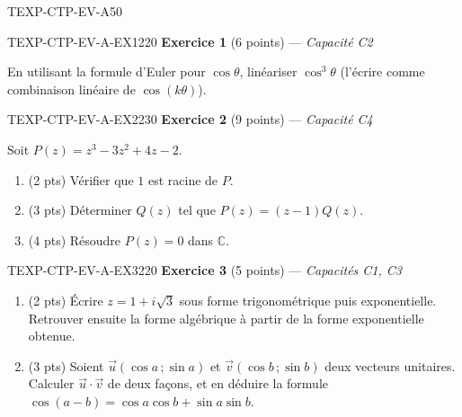 

\begin{evaluation}{TEXP-CTP-EV-A}{50}

\begin{exercice}{TEXP-CTP-EV-A-EX1}{2}{20}
\textbf{Exercice 1} (6 points) --- \textit{Capacité C2}

\medskip

En utilisant la formule d'Euler pour $\cos\theta$, linéariser $\cos^3\theta$ (l'écrire comme combinaison linéaire de $\cos(k\theta)$).
\end{exercice}

\begin{exercice}{TEXP-CTP-EV-A-EX2}{2}{30}
\textbf{Exercice 2} (9 points) --- \textit{Capacité C4}

\medskip

Soit $P(z)=z^3-3z^2+4z-2$.
\begin{enumerate}
  \item (2 pts) Vérifier que $1$ est racine de $P$.
  \item (3 pts) Déterminer $Q(z)$ tel que $P(z)=(z-1)Q(z)$.
  \item (4 pts) Résoudre $P(z)=0$ dans $\mathbb{C}$.
\end{enumerate}
\end{exercice}

\begin{exercice}{TEXP-CTP-EV-A-EX3}{2}{20}
\textbf{Exercice 3} (5 points) --- \textit{Capacités C1, C3}

\medskip

\begin{enumerate}
  \item (2 pts) Écrire $z=1+i\sqrt3$ sous forme trigonométrique puis exponentielle. Retrouver ensuite la forme algébrique à partir de la forme exponentielle obtenue.
  \item (3 pts) Soient $\vec u(\cos a\,;\sin a)$ et $\vec v(\cos b\,;\sin b)$ deux vecteurs unitaires. Calculer $\vec u\cdot\vec v$ de deux façons, et en déduire la formule
  $\cos(a-b)=\cos a\cos b+\sin a\sin b$.
\end{enumerate}
\end{exercice}

\end{evaluation}
